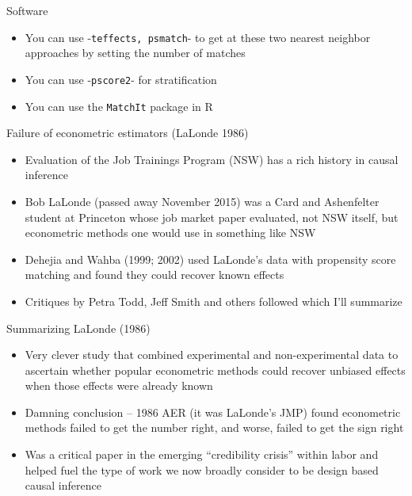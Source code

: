 \documentclass{beamer}
\begin{document}
\begin{frame}{Software}

\begin{itemize}
\item You can use -\texttt{teffects, psmatch}- to get at these two nearest neighbor approaches by setting the number of matches
\item You can use -\texttt{pscore2}- for stratification
\item You can use the \texttt{MatchIt} package in R
\end{itemize}

\end{frame}





		  

\begin{frame}{Failure of econometric estimators (LaLonde 1986)}
	
	\begin{itemize}
	\item Evaluation of the Job Trainings Program (NSW) has a rich history in causal inference
	\item Bob LaLonde (passed away November 2015) was a Card and Ashenfelter student at Princeton whose job market paper evaluated, not NSW itself, but econometric methods one would use in something like NSW
	\item Dehejia and Wahba (1999; 2002) used LaLonde's data with propensity score matching and found they could recover known effects
	\item Critiques by Petra Todd, Jeff Smith and others followed which I'll summarize
	\end{itemize}
\end{frame}

\begin{frame}{Summarizing LaLonde (1986)}

		\begin{itemize}
		\item Very clever study that combined experimental and non-experimental data to ascertain whether popular econometric methods could recover unbiased effects when those effects were already known 
		\item Damning conclusion -- 1986 AER (it was LaLonde's JMP) found econometric methods failed to get the number right, and worse, failed to get the sign right
		\item Was a critical paper in the emerging ``credibility crisis'' within labor and helped fuel the type of work we now broadly consider to be design based causal inference
		\end{itemize}

\end{frame}
\end{document}
